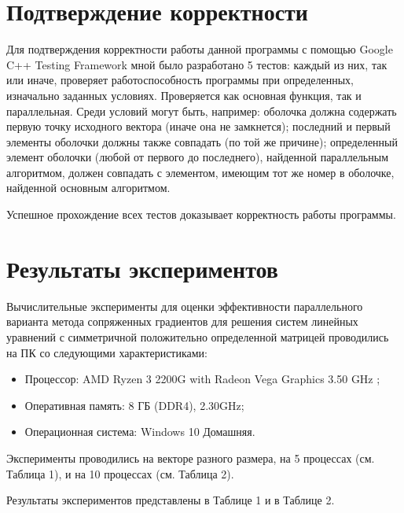 \documentclass{report}
\begin{document}
\section*{Подтверждение корректности}
Для подтверждения корректности работы данной программы с помощью Google C++ Testing Framework мной было разработано 5 тестов: каждый из них, так или иначе, проверяет работоспособность программы при определенных, изначально заданных условиях. Проверяется как основная функция, так и параллельная. Среди условий могут быть, например: оболочка должна содержать первую точку исходного вектора (иначе она не замкнется); последний и первый элементы оболочки должны также совпадать (по той же причине); определенный элемент оболочки (любой от первого до последнего), найденной параллельным алгоритмом, должен совпадать с элементом, имеющим тот же номер в оболочке, найденной основным алгоритмом. 
\par Успешное прохождение всех тестов доказывает корректность работы программы.
\newpage

\section*{Результаты экспериментов}
Вычислительные эксперименты для оценки эффективности параллельного варианта
метода сопряженных градиентов для решения систем линейных уравнений с симметричной положительно определенной матрицей  проводились на ПК со следующими характеристиками:
\begin{itemize}
\item Процессор: AMD Ryzen 3 2200G with Radeon Vega Graphics 3.50 GHz ;
\item Оперативная память: 8 ГБ (DDR4), 2.30GHz;
\item Операционная система: Windows 10 Домашняя.
\end{itemize}

\par Эксперименты проводились на векторе разного размера, на 5 процессах (см. Таблица 1), и на 10 процессах (см. Таблица 2).

\par Результаты экспериментов представлены в Таблице 1 и в Таблице 2.
\end{document}
